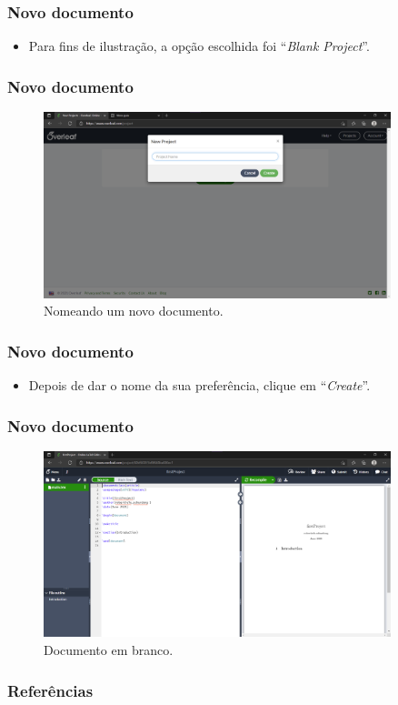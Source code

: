 \documentclass{beamer}
\begin{document}
    \begin{frame}
        \frametitle{Novo documento}
    \begin{itemize}
        \item Para fins de ilustração, a opção escolhida foi ``\textit{Blank Project}''.
    \end{itemize}
        
    
    \end{frame}

    \begin{frame}
        \frametitle{Novo documento}
        \begin{figure}
            \centering
            \caption{Nomeando um novo documento.}
            \label{fig:nameOfProject}
            \includegraphics[width=0.9\textwidth]{../images/nameOfProject.png}
        \end{figure}
    \end{frame}

    \begin{frame}
        \frametitle{Novo documento}
    \begin{itemize}
        \item Depois de dar o nome da sua preferência, clique em ``\textit{Create}''.
    \end{itemize}    
    \end{frame}

    \begin{frame}
        \frametitle{Novo documento}
        \begin{figure}
            \centering
            \caption{Documento em branco.}
            \label{fig:blankProject}
            \includegraphics[width=0.9\textwidth]{../images/blankProject.png}
        \end{figure}    
    \end{frame}

    \begin{frame}
        \frametitle{Referências}
        \nocite{*}
        \printbibliography[]{}
    \end{frame}
\end{document}
